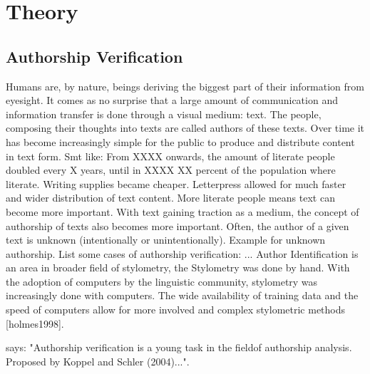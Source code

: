 \chapter{Theory}\label{theory}
\section{Authorship Verification}
Humans are, by nature, beings deriving the biggest part of their information from eyesight.
It comes as no surprise that a large amount of communication and information transfer is done through a visual medium: text.
The people, composing their thoughts into texts are called authors of these texts.
Over time it has become increasingly simple for the public to produce and distribute content in text form.
Smt like: From XXXX onwards, the amount of literate people doubled every X years, until in XXXX XX percent of the population where literate.
Writing supplies became cheaper.
Letterpress allowed for much faster and wider distribution of text content.
More literate people means text can become more important.
With text gaining traction as a medium, the concept of authorship of texts also becomes more important.
Often, the author of a given text is unknown (intentionally or unintentionally).
Example for unknown authorship.
List some cases of authorship verification: ... %
Author Identification is an area in broader field of stylometry, the
Stylometry was done by hand.
With the adoption of computers by the linguistic community, stylometry was increasingly done with computers.
The wide availability of training data and the speed of computers allow for more involved and complex stylometric methods [holmes1998].

\cite{stein2019unbiasedGutenbergCorpus} says: "Authorship verification is a young task in the fieldof authorship analysis.
 Proposed by Koppel and Schler (2004)...".

